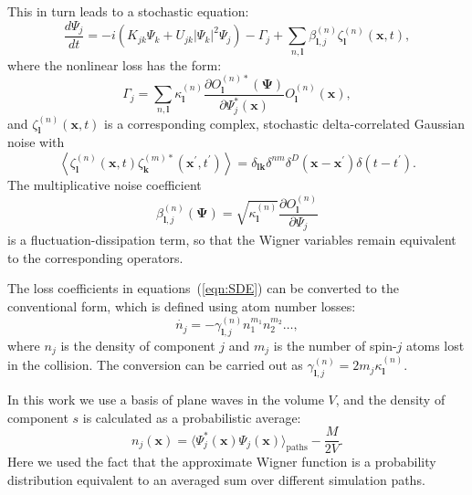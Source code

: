 \documentclass[aps,prl,twocolumn,showpacs,amsmath,amssymb,superscriptaddress,flushbottom,noraggedfooter]{revtex4-1}
\newcommand{\xvec}{\boldsymbol{x}}
\newcommand{\kvec}{\boldsymbol{k}}
\newcommand{\lvec}{\boldsymbol{l}}
\newcommand{\Psivec}{\boldsymbol{\Psi}}
\begin{document}
This in turn leads to a stochastic equation:
\begin{equation}
\label{eqn:SDE}
	\frac{d\Psi_j}{dt} =
		- i\left( K_{jk} \Psi_k + U_{jk} \lvert \Psi_k \rvert^{2} \Psi_j \right)
		- \Gamma_j
		+ \sum_{n,\lvec} \beta_{\lvec,j}^{(n)} \zeta_{\lvec}^{(n)}(\xvec,t),
\end{equation}
where the nonlinear loss has the form:
\begin{equation}
	\Gamma_j = \sum_{n,\lvec}
		\kappa_{\lvec}^{(n)}
		\frac{\partial O_{\lvec}^{(n)*} (\Psivec)}{\partial\Psi_j^{*} (\xvec)}
		O_{\lvec}^{(n)}(\xvec),
\end{equation}
and $\zeta_{\lvec}^{(n)}(\xvec, t)$ is a corresponding complex,
stochastic delta-correlated Gaussian noise with
\begin{equation}
	\left\langle
		\zeta_{\lvec}^{(n)} (\xvec,t) \zeta_{\kvec}^{(m)*}(\xvec^\prime, t^\prime)
	\right\rangle =
	\delta_{\lvec \kvec} \delta^{nm} \delta^{D} \left(
		\xvec - \xvec^\prime
	\right)
	\delta \left( t - t^\prime \right).
\end{equation}
The multiplicative noise coefficient
\begin{equation}
	\beta_{\lvec,j}^{(n)} \left( \Psivec \right) =
	\sqrt{\kappa_{\lvec}^{(n)}}
	\frac{\partial O_{\lvec}^{(n)}}{\partial\Psi_j}
\end{equation}
is a fluctuation-dissipation term,
so that the Wigner variables remain equivalent to the corresponding operators.

The loss coefficients in equations~(\ref{eqn:SDE}) can be converted to the conventional form,
which is defined using atom number losses:
\begin{equation}
	\dot{n_j} = - \gamma^{(n)}_{\lvec,j} n^{m_1}_1 n^{m_2}_2 \ldots ,
\end{equation}
where $n_j$ is the density of component $j$ and $m_j$
is the number of spin-$j$ atoms lost in the collision.
The conversion can be carried out as $\gamma^{(n)}_{\lvec,j} = 2 m_j \kappa^{(n)}_{\lvec}$.

In this work we use a basis of plane waves in the volume $V$,
and the density of component $s$ is calculated as a probabilistic average:
\begin{equation}
\label{eqn:wigner-density}
	n_j (\xvec)
		= \langle \Psi^*_j (\xvec) \Psi_j (\xvec) \rangle_{\mathrm{paths}} - \frac{M}{2V}.
\end{equation}
Here we used the fact that the approximate Wigner function is a probability distribution
equivalent to an averaged sum over different simulation paths.
\end{document}
